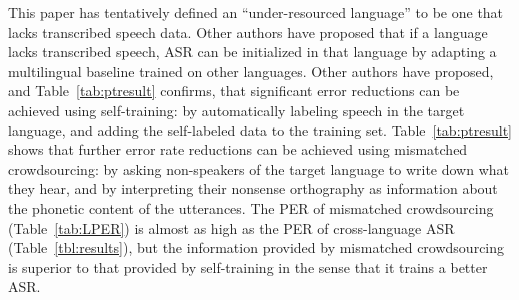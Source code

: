 This paper has tentatively defined an ``under-resourced language'' to
be one that lacks transcribed speech data.  Other authors have
proposed that if a language lacks transcribed speech, ASR can be
initialized in that language by adapting a multilingual baseline
trained on other languages.  Other authors have proposed, and
Table~\ref{tab:ptresult} confirms, that significant error reductions
can be achieved using self-training: by automatically labeling speech
in the target language, and adding the self-labeled data to the
training set.  Table~\ref{tab:ptresult} shows that
further error rate reductions can be achieved using mismatched
crowdsourcing: by asking non-speakers of the target language to write
down what they hear, and by interpreting their nonsense orthography as
information about the phonetic content of the utterances.  The PER of
mismatched crowdsourcing (Table~\ref{tab:LPER}) is almost as high as
the PER of cross-language ASR (Table~\ref{tbl:results}), but the
information provided by mismatched crowdsourcing is superior to that
provided by self-training in the sense that it trains a better ASR.

